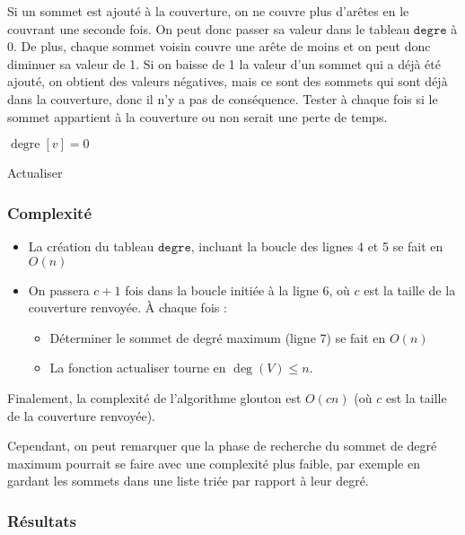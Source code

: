 \documentclass[a4paper,10pt]{article}
\newcommand*{\itemb}{\item[$\bullet$]}
\newcommand*{\itemt}{\item[$\blacktriangleright$]}
\DeclareMathOperator{\degree}{degre}
\DeclareMathOperator{\voisin}{voisin}
\begin{document}
\vspace{0.35cm}
Si un sommet est ajouté à la couverture, on ne couvre plus d'arêtes en le couvrant une seconde fois. On peut donc passer sa valeur dans le tableau $\mathtt{degre}$ à 0. De plus, chaque sommet voisin couvre une arête de moins et on peut donc diminuer sa valeur de 1. Si on baisse de 1 la valeur d'un sommet qui a déjà été ajouté, on obtient des valeurs négatives, mais ce sont des sommets qui sont déjà dans la couverture, donc il n'y a pas de conséquence. Tester à chaque fois si le sommet appartient à la couverture ou non serait une perte de temps.

\vspace{0.35cm}
\begin{algorithm}[H]

\BlankLine
$\degree[v]=0$

\Pour{$i\in \voisin[v]$}{

décrémenter $\voisin[i]$ de 1
}
\caption{Actualiser}
 
\end{algorithm}

\subsubsection{Complexité}

\begin{itemize}
 \itemb La création du tableau $\mathtt{degre}$, incluant la boucle des lignes 4 et 5 se fait en $O(n)$
 \itemb On passera $c+1$ fois dans la boucle initiée à la ligne 6, où $c$ est la taille de la couverture renvoyée. À chaque fois :
\begin{itemize}
\itemt Déterminer le sommet de degré maximum (ligne 7) se fait en $O(n)$
\itemt La fonction actualiser tourne en $\deg(V)\leqslant n$.
\end{itemize}
\end{itemize}

Finalement, la complexité de l'algorithme glouton est $O(cn)$ (où $c$ est la taille de la couverture renvoyée).

Cependant, on peut remarquer que la phase de recherche du sommet de degré maximum pourrait se faire avec une complexité plus faible, par exemple en gardant les sommets dans une liste triée par rapport à leur degré.

\subsubsection{Résultats}
\end{document}
